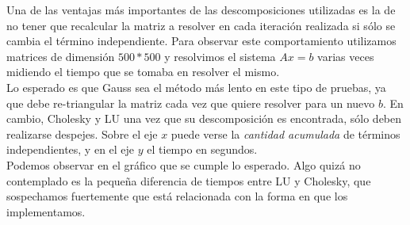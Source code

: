 Una de las ventajas más importantes de las descomposiciones utilizadas es la de no tener que recalcular la matriz a resolver en cada iteración realizada si sólo se cambia el término independiente. Para observar este comportamiento utilizamos matrices de dimensión $500*500$ y resolvimos el sistema $Ax = b$ varias veces midiendo el tiempo que se tomaba en resolver el mismo. \\

Lo esperado es que Gauss sea el método más lento en este tipo de pruebas, ya que debe re-triangular la matriz cada vez que quiere resolver para un nuevo $b$. En cambio, Cholesky y LU una vez que su descomposición es encontrada, sólo deben realizarse despejes. Sobre el eje $x$ puede verse la \textit{cantidad acumulada} de términos independientes, y en el eje $y$ el tiempo en segundos. \\

Podemos observar en el gráfico que se cumple lo esperado. Algo quizá no contemplado es la pequeña diferencia de tiempos entre LU y Cholesky, que sospechamos fuertemente que está relacionada con la forma en que los implementamos.





